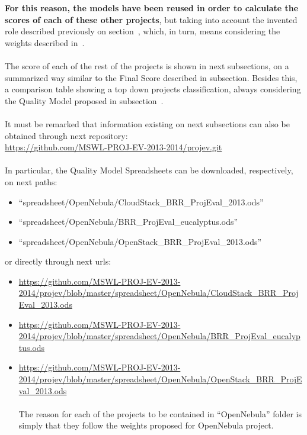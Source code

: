 \documentclass[11pt]{article}
\begin{document}
\textbf{For this reason, the models have been reused in order to calculate the scores of each of these other projects}, but taking into account the invented role described previously on section~, which, in turn, means considering the weights described in~.\\
\\
The score of each of the rest of the projects is shown in next subsections, on a summarized way similar to the Final Score described in subsection\label{sec:final_score}. Besides this, a comparison table showing a top down projects classification, always considering the Quality Model proposed in subsection~.\\
\\
It must be remarked that information existing on next subsections can also be obtained through next repository:
\\
\url{https://github.com/MSWL-PROJ-EV-2013-2014/projev.git}\\
\\
In particular, the Quality Model Spreadsheets can be downloaded, respectively, on next paths:
\begin{itemize}\itemsep0pt
\item{``spreadsheet/OpenNebula/CloudStack\_BRR\_ProjEval\_2013.ods''}
\item{``spreadsheet/OpenNebula/BRR\_ProjEval\_eucalyptus.ods''}
\item{``spreadsheet/OpenNebula/OpenStack\_BRR\_ProjEval\_2013.ods''}
\end{itemize}
or directly through next urls:
\begin{itemize}\itemsep0pt
\item{\url{https://github.com/MSWL-PROJ-EV-2013-2014/projev/blob/master/spreadsheet/OpenNebula/CloudStack\_BRR\_ProjEval\_2013.ods}}
\item{\url{https://github.com/MSWL-PROJ-EV-2013-2014/projev/blob/master/spreadsheet/OpenNebula/BRR\_ProjEval\_eucalyptus.ods}}
\item{\url{https://github.com/MSWL-PROJ-EV-2013-2014/projev/blob/master/spreadsheet/OpenNebula/OpenStack\_BRR\_ProjEval\_2013.ods}}\\
\\
The reason for each of the projects to be contained in ``OpenNebula'' folder is simply that they follow the weights proposed for OpenNebula project.
\end{itemize}
\end{document}
